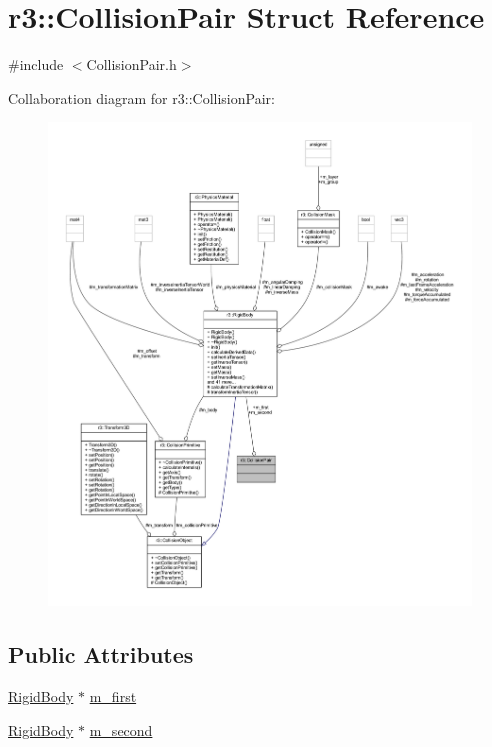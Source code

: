 \hypertarget{structr3_1_1_collision_pair}{}\section{r3\+:\+:Collision\+Pair Struct Reference}
\label{structr3_1_1_collision_pair}


{\ttfamily \#include $<$Collision\+Pair.\+h$>$}



Collaboration diagram for r3\+:\+:Collision\+Pair\+:\nopagebreak
\begin{figure}[H]
\begin{center}
\leavevmode
\includegraphics[width=350pt]{structr3_1_1_collision_pair__coll__graph}
\end{center}
\end{figure}
\subsection*{Public Attributes}
\begin{DoxyCompactItemize}
\item 
\mbox{\hyperlink{classr3_1_1_rigid_body}{Rigid\+Body}} $\ast$ \mbox{\hyperlink{structr3_1_1_collision_pair_a6c2fbf8e05b333a4e93f6ac75049d429}{m\+\_\+first}}
\item 
\mbox{\hyperlink{classr3_1_1_rigid_body}{Rigid\+Body}} $\ast$ \mbox{\hyperlink{structr3_1_1_collision_pair_ad7ff97123502a1e0535d3f5da8013411}{m\+\_\+second}}
\end{DoxyCompactItemize}



